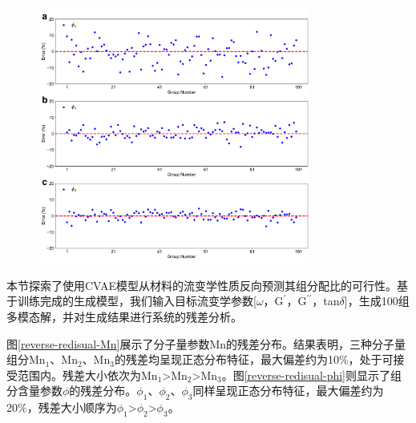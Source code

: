 \begin{figure}[htbp]
  \centering
  \includegraphics[width=0.8\textwidth]{Fig/reverse-redisual-phi.pdf}
\end{figure}
本节探索了使用CVAE模型从材料的流变学性质反向预测其组分配比的可行性。基于训练完成的生成模型，我们输入目标流变学参数[$\omega$，$\mathrm{G^{\prime}}$，$\mathrm{G^{\prime\prime}}$，tan$\delta$]，生成100组多模态解，并对生成结果进行系统的残差分析。

图\ref{reverse-redisual-Mn}展示了分子量参数Mn的残差分布。结果表明，三种分子量组分Mn$_1$、Mn$_2$、Mn$_3$的残差均呈现正态分布特征，最大偏差约为10\%，处于可接受范围内。残差大小依次为Mn$_1$>Mn$_2$>Mn$_3$。图\ref{reverse-redisual-phi}则显示了组分含量参数$\phi$的残差分布。$\phi_1$、$\phi_2$、$\phi_3$同样呈现正态分布特征，最大偏差约为20\%，残差大小顺序为$\phi_1$>$\phi_2$>$\phi_3$。

